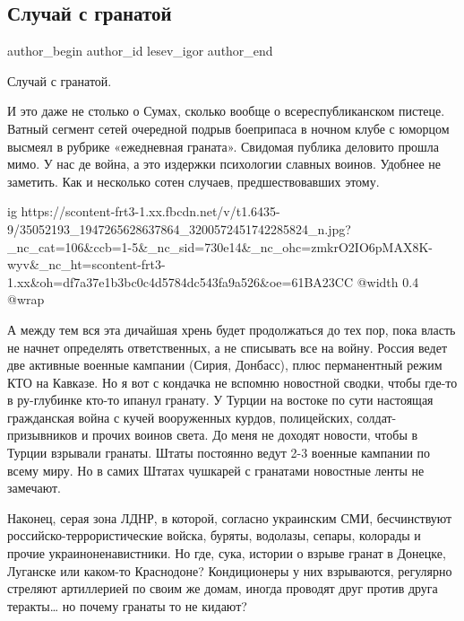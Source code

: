  
 
 
 
 
 
\subsection{Случай с гранатой}
\label{sec:11_06_2018.fb.lesev_igor.1.sluchaj_s_granatoj}
 
\ifcmt
 author_begin
   author_id lesev_igor
 author_end
\fi

Случай с гранатой.

И это даже не столько о Сумах, сколько вообще о всереспубликанском пистеце.
Ватный сегмент сетей очередной подрыв боеприпаса в ночном клубе с юморцом
высмеял в рубрике «ежедневная граната». Свидомая публика деловито прошла мимо.
У нас де война, а это издержки психологии славных воинов. Удобнее не заметить.
Как и несколько сотен случаев, предшествовавших этому.

\ifcmt
  ig https://scontent-frt3-1.xx.fbcdn.net/v/t1.6435-9/35052193_1947265628637864_3200572451742285824_n.jpg?_nc_cat=106&ccb=1-5&_nc_sid=730e14&_nc_ohc=zmkrO2IO6pMAX8K-wyv&_nc_ht=scontent-frt3-1.xx&oh=df7a37e1b3bc0c4d5784dc543fa9a526&oe=61BA23CC
  @width 0.4
  @wrap 
\fi

А между тем вся эта дичайшая хрень будет продолжаться до тех пор, пока власть
не начнет определять ответственных, а не списывать все на войну. Россия ведет
две активные военные кампании (Сирия, Донбасс), плюс перманентный режим КТО на
Кавказе. Но я вот с кондачка не вспомню новостной сводки, чтобы где-то в
ру-глубинке кто-то ипанул гранату. У Турции на востоке по сути настоящая
гражданская война с кучей вооруженных курдов, полицейских, солдат-призывников и
прочих воинов света. До меня не доходят новости, чтобы в Турции взрывали
гранаты. Штаты постоянно ведут 2-3 военные кампании по всему миру. Но в самих
Штатах чушкарей с гранатами новостные ленты не замечают.

Наконец, серая зона ЛДНР, в которой, согласно украинским СМИ, бесчинствуют
российско-террористические войска, буряты, водолазы, сепары, колорады и прочие
украиноненавистники. Но где, сука, истории о взрыве гранат в Донецке, Луганске
или каком-то Краснодоне? Кондиционеры у них взрываются, регулярно стреляют
артиллерией по своим же домам, иногда проводят друг против друга теракты… но
почему гранаты то не кидают?

